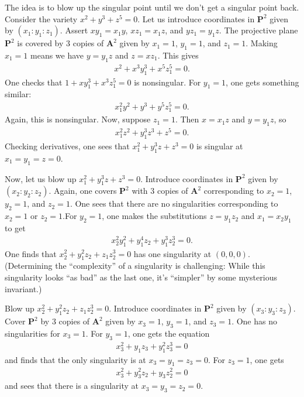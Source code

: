 \documentclass [11 pt, oneside, margin = 1 in] {article}
\begin{document}
\begin{example}\label{}\text{}
The idea is to blow up the singular point until we don't get a singular point back. Consider the variety $x^2+y^3+z^5=0$. Let us introduce coordinates in $\mathbf{P}^2$ given by $(x_1:y_1:z_1)$. Assert $xy_1=x_1y$, $xz_1=x_1z$, and $yz_1=y_1z$. The projective plane $\mathbf{P}^2$ is covered by $3$ copies of $\mathbf{A}^2$ given by $x_1=1$, $y_1=1$, and $z_1=1$. Making $x_1=1$ means we have $y=y_1z$ and $z=xz_1$. This gives 
\begin{align*}
	x^2+x^3y_1^3+x^5z_1^5=0.
\end{align*}
One checks that $1+xy_1^3 + x^3z_1^5=0$ is nonsingular. For $y_1=1$, one gets something similar:
\begin{align*}
	x_1^2y^2 + y^3 +y^5z_1^5=0.
\end{align*}
Again, this is nonsingular. Now, suppose $z_1=1$. Then $x=x_1z$ and $y=y_1z$, so
\begin{align*}
	x_1^2z^2 + y_1^3z^3 + z^5 =0.
\end{align*}
Checking derivatives, one sees that $x_1^2 + y_1^3z+z^3=0$ is singular at $x_1=y_1=z=0$.

Now, let us blow up $x_1^2+y_1^3z+z^3=0$. Introduce coordinates in $\mathbf{P}^2$ given by $(x_2:y_2:z_2)$. Again, one covers $\mathbf{P}^2$ with $3$ copies of $\mathbf{A}^2$ corresponding to $x_2=1$, $y_2=1$, and $z_2=1$. One sees that there are no singularities corresponding to $x_2=1$ or $z_2=1$.For $y_2=1$, one makes the substitutions $z=y_1z_2$ and $x_1=x_2y_1$ to get
\begin{align*}
	x_2^2y_1^2 + y_1^4z_2+y_1^3z_2^3=0.
\end{align*}
One finds that $x_2^2+y_1^2z_2+z_1z_2^3=0$ has one singularity at $(0,0,0)$. (Determining the ``complexity'' of a singularity is challenging: While this singularity looks ``as bad'' as the last one, it's ``simpler'' by some mysterious invariant.)

Blow up $x_2^2+y_1^2z_2+z_1z_2^3=0$. Introduce coordinates in $\mathbf{P}^2$ given by $(x_3:y_3:z_3)$. Cover $\mathbf{P}^2$ by $3$ copies of $\mathbf{A}^2$ given by $x_3=1$, $y_3=1$, and $z_3=1$. One has no singularities for $x_3=1$. For $y_3=1$, one gets the equation 
\begin{align*}
	x_3^2+y_1z_3+y_1^2z_3^3 =0
\end{align*}
and finds that the only singularity is at $x_3=y_1=z_3=0$. For $z_3=1$, one gets
\begin{align*}
	x_3^2+y_3^2z_2+y_3z_2^2 =0
\end{align*}
and sees that there is a singularity at $x_3=y_3=z_2=0$.


\end{example}
\end{document}
